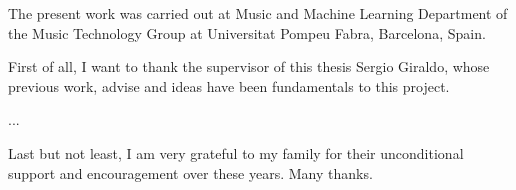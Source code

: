 
\begin{acknowledgement}
The present work was carried out at Music and Machine Learning Department of the Music Technology Group at Universitat Pompeu Fabra, Barcelona, Spain.

First of all, I want to thank the supervisor of this thesis Sergio Giraldo, whose previous work, advise and ideas have been fundamentals to this project.

... 

Last  but  not  least, I  am  very grateful to  my  family for their unconditional support and encouragement over these years. Many thanks.

\newpage
\end{acknowledgement}